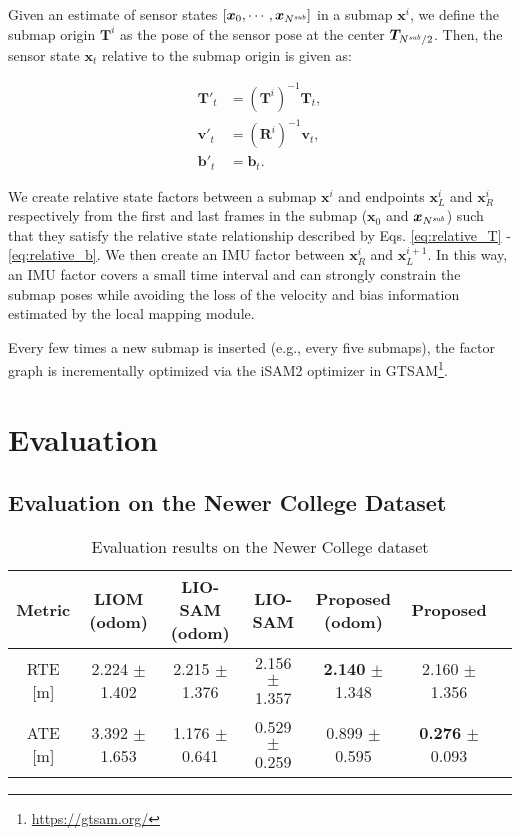 \documentclass[letterpaper, 10 pt, conference]{ieeeconf}  %
\begin{document}
Given an estimate of sensor states $[{\bm x}_0, \cdots, {\bm x}_{N^{\text{\it sub}}}]$ in a submap ${\bm x}^i$, we define the submap origin ${\bm T}^i$ as the pose of the sensor pose at the center ${\bm T}_{N^{\text{\it sub}}/2}$. Then, the sensor state ${\bm x}_t$ relative to the submap origin is given as:

\begin{align}
\label{eq:relative_T}
{\bm T}'_t &= \left( {\bm T}^i \right)^{-1} {\bm T}_t, \\
\label{eq:relative_v}
{\bm v}'_t &= \left( {\bm R}^i \right)^{-1} {\bm v}_t, \\
\label{eq:relative_b}
{\bm b}'_t &= {\bm b}_t.
\end{align}

We create relative state factors between a submap ${\bm x}^i$ and endpoints ${\bm x}^i_L$ and ${\bm x}^i_R$ respectively from the first and last frames in the submap (${\bm x}_0$ and ${\bm x}_{N^{\text{\it sub}}}$) such that they satisfy the relative state relationship described by Eqs. \ref{eq:relative_T} - \ref{eq:relative_b}. We then create an IMU factor between ${\bm x}^i_R$ and ${\bm x}^{i+1}_L$. In this way, an IMU factor covers a small time interval and can strongly constrain the submap poses while avoiding the loss of the velocity and bias information estimated by the local mapping module. 

Every few times a new submap is inserted (e.g., every five submaps), the factor graph is incrementally optimized via the iSAM2 optimizer \cite{Kaess2011} in GTSAM\footnote{\url{https://gtsam.org/}}.


\section{Evaluation}


\subsection{Evaluation on the Newer College Dataset}

\begin{table*}[tb]
  \centering
  \caption{Evaluation results on the Newer College dataset}
  \label{tab:result_newer}
  \begin{tabular}{c|cccccc}
  \toprule
  Metric     & LIOM (odom)       & LIO-SAM (odom)    & LIO-SAM           & Proposed (odom)   & Proposed \\
  \midrule
  RTE [m]    & 2.224 $\pm$ 1.402 & 2.215 $\pm$ 1.376 & 2.156 $\pm$ 1.357 & {\bf 2.140} $\pm$ 1.348 & 2.160 $\pm$ 1.356  \\
  ATE [m]    & 3.392 $\pm$ 1.653 & 1.176 $\pm$ 0.641 & 0.529 $\pm$ 0.259 & 0.899 $\pm$ 0.595       & {\bf 0.276} $\pm$ 0.093  \\
  \bottomrule
  \end{tabular}
\end{table*}
\end{document}
